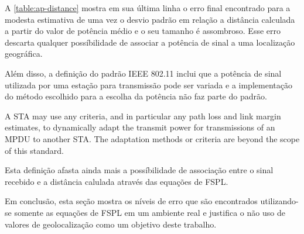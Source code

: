 A \autoref{table:ap-distance} mostra em sua última linha o erro final encontrado
para a modesta estimativa de uma vez o desvio padrão em relação a distância
calculada a partir do valor de potência médio e o seu tamanho é assombroso.
Esse erro descarta qualquer possíbilidade de associar a potência de sinal a uma
localização geográfica.

Além disso, a definição do padrão IEEE 802.11 inclui que a potência de sinal
utilizada por uma estação para transmissão pode ser variada e a implementação
do método escolhido para a escolha da potência não faz parte do padrão.

\begin{citacao}[english]

	A STA may use any criteria, and in particular any path loss and link margin
	estimates, to dynamically adapt the transmit power for transmissions of an
	MPDU to another STA. The adaptation methods or criteria are beyond the scope
	of this standard. \

\end{citacao}

Esta definição afasta ainda mais a possíbilidade de associação entre o sinal
recebido e a distância calulada através das equações de FSPL.

Em conclusão, esta seção mostra os níveis de erro que são encontrados
utilizando-se somente as equações de FSPL em um ambiente real e justifica o não
uso de valores de geolocalização como um objetivo deste trabalho.
